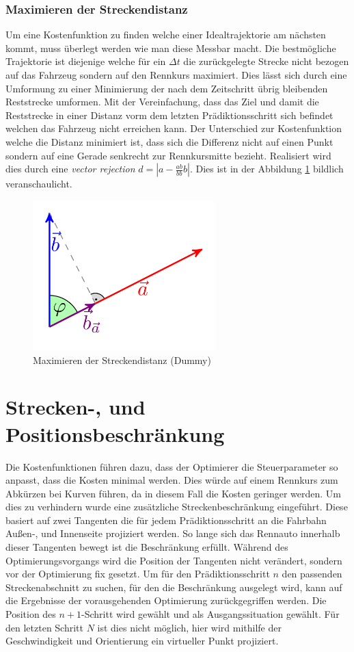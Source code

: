 \documentclass{like}
\begin{document}
\subsubsection*{Maximieren der Streckendistanz}
Um eine Kostenfunktion zu finden welche einer Idealtrajektorie am nächsten kommt, muss überlegt werden wie man diese Messbar macht. Die bestmögliche Trajektorie ist diejenige welche für ein $\Delta t$ die zurückgelegte Strecke nicht bezogen auf das Fahrzeug sondern auf den Rennkurs maximiert. Dies lässt sich durch eine Umformung zu einer Minimierung der nach dem Zeitschritt übrig bleibenden Reststrecke umformen. Mit der Vereinfachung, dass das Ziel und damit die Reststrecke in einer Distanz vorm dem letzten Prädiktionsschritt sich befindet welchen das Fahrzeug nicht erreichen kann. Der Unterschied zur Kostenfunktion welche die Distanz minimiert ist, dass sich die Differenz nicht auf einen Punkt sondern auf eine Gerade senkrecht zur Rennkursmitte bezieht.
Realisiert wird dies durch eine \emph{vector rejection}
$d = |a - \frac{ab}{bb}b| $. Dies ist in der Abbildung \ref{fig:maxDist} bildlich veranschaulicht.

\begin{figure}[ht!]
	\centering
	\includegraphics[width=200pt]{Abbildungen/maxDist.png}
	\caption{Maximieren der Streckendistanz (Dummy)}
	\label{fig:maxDist}
\end{figure}

\section{Strecken-, und Positionsbeschränkung}
\label{trackAndPosConstraint}
Die Kostenfunktionen führen dazu, dass der Optimierer die Steuerparameter so anpasst, dass die Kosten minimal werden. Dies würde auf einem Rennkurs zum Abkürzen bei Kurven führen, da in diesem Fall die Kosten geringer werden. Um dies zu verhindern wurde eine zusätzliche Streckenbeschränkung eingeführt. Diese basiert auf zwei Tangenten die für jedem Prädiktionsschritt an die Fahrbahn Außen-, und Innenseite projiziert werden. So lange sich das Rennauto innerhalb dieser Tangenten bewegt ist die Beschränkung erfüllt. Während des Optimierungsvorgangs wird die Position der Tangenten nicht verändert, sondern vor der Optimierung fix gesetzt. Um für den Prädiktionsschritt \(n\) den passenden Streckenabschnitt zu suchen, für den die Beschränkung ausgelegt wird, kann auf die Ergebnisse der vorausgehenden Optimierung zurückgegriffen werden. Die Position des $n+1$-Schritt wird gewählt und als Ausgangssituation gewählt. Für den letzten Schritt \(N\) ist dies nicht möglich, hier wird mithilfe der Geschwindigkeit und Orientierung ein virtueller Punkt projiziert.   
\end{document}

